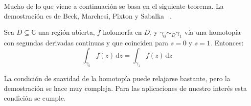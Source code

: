   Mucho de lo que viene a continuación
  se basa en el siguiente teorema.
  La demostración es de Beck, Marchesi, Pixton y Sabalka~%
    \cite{beck12:_first_course_compl_analysis}.
  \begin{theorem}[Cauchy]
    Sea \(D \subseteq \mathbb{C}\) una región abierta,
    \(f\) holomorfa en \(D\),
    y \(\gamma_0 \sim_D \gamma_1\) vía una homotopía
    con segundas derivadas continuas
    y que coinciden para \(s = 0\) y \(s = 1\).
    Entonces:
    \begin{equation*}
      \int_{\gamma_0} f(z) \, \mathrm{d} z
	= \int_{\gamma_1} f(z) \, \mathrm{d} z
    \end{equation*}
  \end{theorem}
  La condición de suavidad de la homotopía puede relajarse bastante,
  pero la demostración se hace muy compleja.
  Para las aplicaciones de nuestro interés
  esta condición se cumple.
